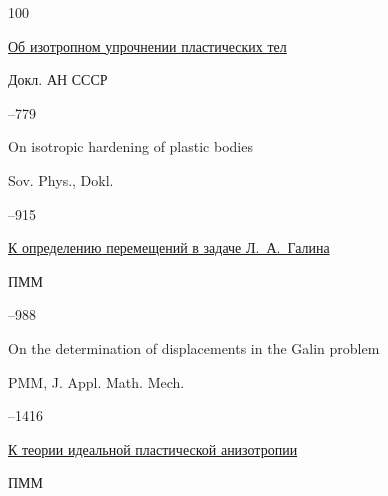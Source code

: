 \begin{thebibliography}{100}

\paper \href{https://zbmath.org/?q=an:0097.39903}{Об изотропном упрочнении пластических тел}

\jour Докл. АН СССР




–779


\transl


\paper On isotropic hardening of plastic bodies

\jour Sov. Phys., Dokl.


--915 







\paper  \href{https://zbmath.org/?q=an:0097.40205}{К определению перемещений в задаче Л.~А.~Галина}

\jour ПММ




–988


\transl


\paper On the determination of displacements in the Galin problem

\jour PMM, J. Appl. Math. Mech. 


--1416 








\paper \href{https://zbmath.org/?q=an:0094.19707}{К теории идеальной пластической анизотропии}

\jour ПММ





\end{thebibliography}
